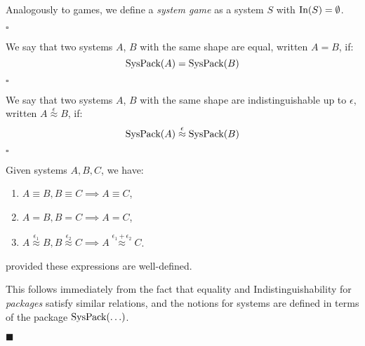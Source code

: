 \begin{definition}
Analogously to games, we define a \emph{system game} as a system $S$
with $\text{In}(S) = \emptyset$.

$\square$
\end{definition}

\begin{definition}
  We say that two systems $A$, $B$ with the same shape are equal, written $A = B$,
  if:
  $$
  \text{SysPack}(A) = \text{SysPack}(B)
  $$

  $\square$
\end{definition}

\begin{definition}
  We say that two systems $A$, $B$ with the same shape are indistinguishable up to $\epsilon$,
  written $A \overset{\epsilon}{\approx} B$,
  if:
  $$
  \text{SysPack}(A) \overset{\epsilon}{\approx} \text{SysPack}(B)
  $$

  $\square$
\end{definition}

\begin{lemma}
  Given systems $A, B, C$, we have:
  \begin{enumerate}
    \item $A \equiv B, B \equiv C \implies A \equiv C$,
    \item $A = B, B = C \implies A = C$,
    \item $A \overset{\epsilon_1}{\approx} B, B \overset{\epsilon_2}{\approx} C \implies A \overset{\epsilon_1 + \epsilon_2}{\approx} C$.
  \end{enumerate}
  provided these expressions are well-defined.

   This follows immediately from the fact that equality and Indistinguishability
  for \emph{packages} satisfy similar relations, and the notions for systems are
  defined in terms of the package $\text{SysPack}(\ldots)$.

  $\blacksquare$
\end{lemma}

